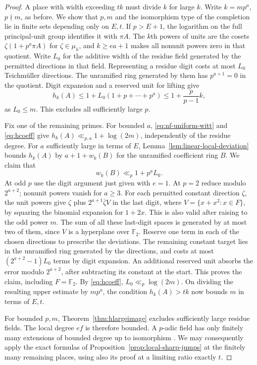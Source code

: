 \documentclass[11pt,letterpaper]{article}
\theoremstyle{definition}
\numberwithin{equation}{section}
\begin{document}
\begin{proof}
A place with width exceeding $tk$ must divide $k$ for large $k$.
Write $k=mp^a$, $p\nmid m$, as before. We show that $p,m$ and the
isomorphism type of the completion lie in finite sets depending
only on $E,t$. If $p>E+1$, the logarithm on the full principal-unit
group identifies it with $\pi A$. The $k$th powers of units are the
cosets $\zeta(1+p^a\pi A)$ for $\zeta\in\mu_h$, and $k\ge ea+1$
makes all nonunit powers zero in that quotient. Write $L_0$ for the
additive width of the residue field generated by the permitted
directions in that field. Representing a residue digit costs at most
$L_0$ Teichm\"uller directions. The unramified ring generated by them
has $p^{a+1}=0$ in the quotient. Digit expansion and a reserved
unit for lifting give
\[
 h_k(A)\le 1+L_0(1+p+\cdots+p^a)
            \le 1+\frac{p}{p-1}k ,
\]
as $L_0\le m$. This excludes all sufficiently large $p$.

Fix one of the remaining primes. For bounded $a$,
\eqref{eq:nf-uniform-witt} and \eqref{eq:hcoeff} give
$h_k(A)\ll_{p,a}1+\log(2m)$, independently of the residue degree.
For $a$ sufficiently large in terms of $E$, Lemma~\ref{lem:linear-local-deviation}
bounds $h_k(A)$ by $a+1+w_k(B)$ for the unramified coefficient ring $B$.
We claim that
\[
                    w_k(B)\ll_p 1+p^a L_0 .
\]
At odd $p$ use the digit argument just given with $e=1$. At $p=2$
reduce modulo $2^{a+2}$; nonunit powers vanish for $a\ge3$. For
each permitted constant direction $\zeta$, the unit powers give
$\zeta$ plus $2^{a+1}\bar\zeta V$ in the last digit, where
$V=\{x+x^2:x\in F\}$, by squaring the binomial expansion for
$1+2x$. This is also valid after raising to the odd power $m$.
The sum of all these last-digit spaces is generated by at most
two of them, since $V$ is a hyperplane over $\mathbb F_2$.
Reserve one term in each of the chosen directions to prescribe
the deviations. The remaining constant target lies in the unramified
ring generated by the directions, and costs at most
$(2^{a+2}-1)L_0$ terms by digit expansion. An additional reserved
unit absorbs the error modulo $2^{a+2}$, after subtracting its
constant at the start. This proves the claim, including $F=\mathbb F_2$.
By \eqref{eq:hcoeff}, $L_0\ll_p\log(2m)$. On dividing the resulting
upper estimate by $mp^a$, the condition $h_k(A)>tk$ now bounds $m$
in terms of $E,t$.

For bounded $p,m$, Theorem~\ref{thm:hlargeimage} excludes sufficiently
large residue fields. The local degree $ef$ is therefore bounded. A
$p$-adic field has only finitely many extensions of bounded degree up
to isomorphism \cite{ednark}. We may consequently apply the exact
formulas of Proposition~\ref{prop:local-sharp-jumps} at the finitely
many remaining places, using also its proof at a limiting ratio
exactly $t$.


\end{proof}
\end{document}
